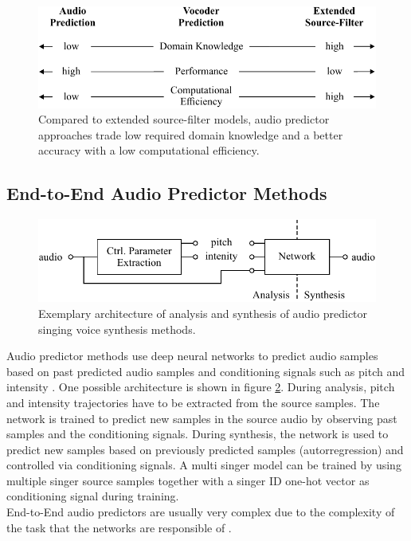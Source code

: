\begin{figure}[H]
    \centering
    \includegraphics{Graphics/006_method_compairson.pdf}
    \caption{Compared to extended source-filter models, audio predictor approaches trade low required domain knowledge and a better accuracy with a low computational efficiency.}
    \label{fig:method_comparison}
\end{figure}

\subsection*{End-to-End Audio Predictor Methods}

\begin{figure}[H]
    \centering
    \includegraphics{Graphics/007_method_audio_predictor.pdf}
    \caption{Exemplary architecture of analysis and synthesis of audio predictor  singing voice synthesis methods.}
    \label{fig:method_audio_predictor}
\end{figure}

Audio predictor methods use deep neural networks to predict audio samples based on past predicted audio samples and conditioning signals such as pitch and intensity \cite{oord_wavenet:_2016}. One possible architecture is shown in figure \ref{fig:method_audio_predictor}. During analysis, pitch and intensity trajectories have to be extracted from the source samples. The network is trained to predict new samples in the source audio by observing past samples and the conditioning signals. During synthesis, the network is used to predict new samples based on previously predicted samples (autorregression) and controlled via conditioning signals. A multi singer model can be trained by using multiple singer source samples together with a singer ID one-hot vector as conditioning signal during training. \\
End-to-End audio predictors are usually very complex due to the complexity of the task that the networks are responsible of \cite{engel_ddsp:_2020}.

